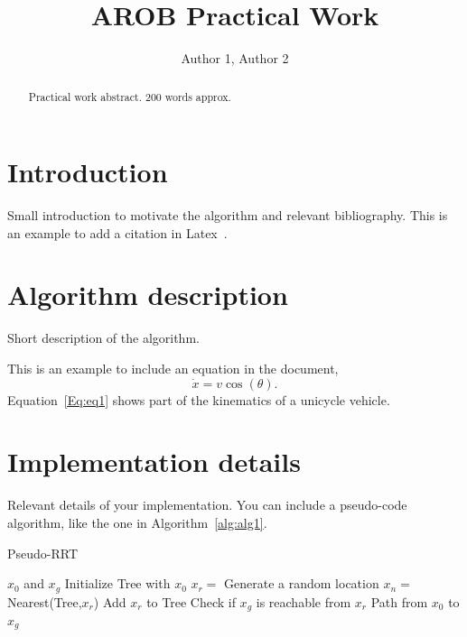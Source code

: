 \documentclass[letterpaper, 10 pt, conference]{ieeeconf}
\title{\LARGE\bf AROB Practical Work}
\author{\centering Author 1, Author 2}
\begin{document}
\maketitle


\begin{abstract}

Practical work abstract. 200 words approx.

\end{abstract}


\section{Introduction}\label{sec:intro}
Small introduction to motivate the algorithm and relevant bibliography.
This is an example to add a citation in Latex~\cite{thrun2005probabilistic}.


\section{Algorithm description}\label{sec:algorithm}
Short description of the algorithm.

This is an example to include an equation in the document,
\begin{equation}
\label{Eq:eq1}
    \dot{x} = v \cos(\theta).
\end{equation}
Equation~\eqref{Eq:eq1} shows part of the kinematics of a unicycle vehicle.



\section{Implementation details}\label{sec:implementation}
Relevant details of your implementation. You can include a pseudo-code algorithm, like the one in Algorithm~\ref{alg:alg1}.
\renewcommand{\algorithmiccomment}[1]{{\small// \textit{#1.}}}
\begin{algorithm}[!ht]
\caption{Pseudo-RRT}
\label{alg:alg1}
\begin{algorithmic}[1]
\REQUIRE $x_0$ and $x_g$
\STATE Initialize Tree with $x_0$
    \STATE $x_r =$ Generate a random location
    \STATE $x_n =$ Nearest(Tree,$x_r$)
        \STATE Add $x_r$ to Tree
        \STATE Check if $x_g$ is reachable from $x_r$
    \ENDIF
\ENDWHILE
\RETURN Path from $x_0$ to $x_g$
\end{algorithmic}
\end{algorithm}
\end{document}
